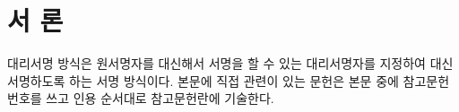 
\section{서 론}

대리서명 방식은 원서명자를 대신해서 서명을 할 수 있는 대리서명자를 지정하여
대신 서명하도록 하는 서명 방식이다. 본문에 직접 관련이 있는 문헌은 본문 중에
참고문헌 번호를 쓰고 인용 순서대로 참고문헌란에 기술한다\cite{kim2008,nguyen2008}.
